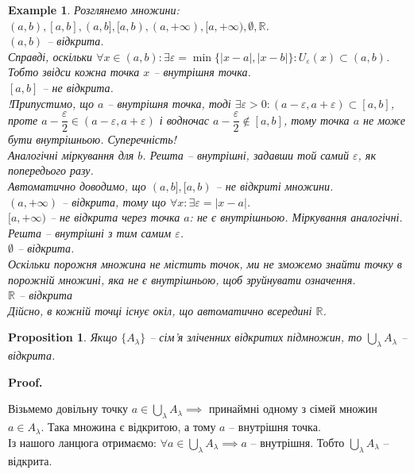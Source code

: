 \documentclass[a4paper, 14pt]{article}
\makeatletter
\def\qed{$\blacksquare$}
\theoremstyle{theoremdd}
\theoremstyle{theoremdd}
\theoremstyle{theoremdd}
\theoremstyle{theoremdd}
\newtheorem{example}[theorem]{Example}
\theoremstyle{theoremdd}
\newtheorem{proposition}[theorem]{Proposition}
\theoremstyle{theoremdd}
\theoremstyle{theoremdd}
\theoremstyle{theoremdd}
\renewenvironment{proof}[1][Proof.\\]{\par
\pushQED{\hfill \qed}%
\normalfont \topsep6\p@\@plus6\p@\relax
\trivlist
\item\relax
{\bfseries
#1\@addpunct{.}}\hspace\labelsep\ignorespaces
}{%
\popQED\endtrivlist\@endpefalse
}
\makeatother
\begin{document}
\begin{example}
Розглянемо множини: $(a,b), [a,b], (a,b], [a,b), (a,+\infty), [a,+\infty), \emptyset, \mathbb{R}$.\\
$(a,b)$ -- відкрита.\\
Справді, оскільки $\forall x \in (a,b): \exists \varepsilon = \min\{|x-a|,|x-b|\}:  U_{\varepsilon}(x) \subset (a,b)$. Тобто звідси кожна точка $x$ -- внутрішня точка.
\bigskip \\
$[a,b]$ -- не відкрита.\\
!Припустимо, що $a$ -- внутрішня точка, тоді $\exists \varepsilon > 0: (a-\varepsilon, a+\varepsilon) \subset [a,b]$, проте $a-\dfrac{\varepsilon}{2} \in (a - \varepsilon, a + \varepsilon)$ і водночас $a-\dfrac{\varepsilon}{2} \not \in [a,b]$, тому точка $a$ не може бути внутрішньою. Суперечність! \\
Аналогічні міркування для $b$. Решта -- внутрішні, задавши той самий $\varepsilon$, як попередього разу.
\bigskip \\
Автоматично доводимо, що $(a,b],[a,b)$ -- не відкриті множини.
\bigskip \\
$(a,+\infty)$ -- відкрита, тому що $\forall x: \exists \varepsilon = |x-a|$.
\bigskip \\
$[a,+\infty)$ -- не відкрита через точка $a$: не є внутрішньою. Міркування аналогічні. Решта -- внутрішні з тим самим $\varepsilon$.
\bigskip \\
$\emptyset$ -- відкрита. \\
Оскільки порожня множина не містить точок, ми не зможемо знайти точку в порожній множині, яка не є внутрішньою, щоб зруйнувати означення.
\bigskip \\
$\mathbb{R}$ -- відкрита\\
Дійсно, в кожній точці існує окіл, що автоматично всередині $\mathbb{R}$.
\end{example}

\begin{proposition}
Якщо $\{A_{\lambda}\}$ -- сім'я зліченних відкритих підмножин, то $\displaystyle \bigcup_{\lambda} A_{\lambda}$ -- відкрита.
\end{proposition}

\begin{proof}
Візьмемо довільну точку $a \in \displaystyle \bigcup_{\lambda} A_{\lambda} \implies$ принаймні одному з сімей множин $a \in A_{\lambda}$. Така множина є відкритою, а тому $a$ -- внутрішня точка.\\
Із нашого ланцюга отримаємо: $\forall a \in \displaystyle \bigcup_{\lambda} A_{\lambda} \implies a$ -- внутрішня. Тобто $\displaystyle \bigcup_{\lambda} A_{\lambda}$ -- відкрита.
\end{proof}
\end{document}
